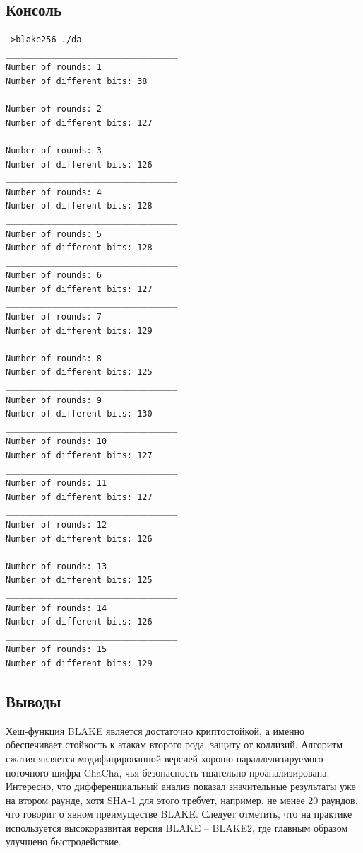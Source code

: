 \documentclass[12pt]{article}
\begin{document}
\subsection*{Консоль}
\begin{lstlisting}
->blake256 ./da
__________________________________
Number of rounds: 1
Number of different bits: 38
__________________________________
Number of rounds: 2
Number of different bits: 127
__________________________________
Number of rounds: 3
Number of different bits: 126
__________________________________
Number of rounds: 4
Number of different bits: 128
__________________________________
Number of rounds: 5
Number of different bits: 128
__________________________________
Number of rounds: 6
Number of different bits: 127
__________________________________
Number of rounds: 7
Number of different bits: 129
__________________________________
Number of rounds: 8
Number of different bits: 125
__________________________________
Number of rounds: 9
Number of different bits: 130
__________________________________
Number of rounds: 10
Number of different bits: 127
__________________________________
Number of rounds: 11
Number of different bits: 127
__________________________________
Number of rounds: 12
Number of different bits: 126
__________________________________
Number of rounds: 13
Number of different bits: 125
__________________________________
Number of rounds: 14
Number of different bits: 126
__________________________________
Number of rounds: 15
Number of different bits: 129

\end{lstlisting}

\newpage

\subsection*{Выводы}
Хеш-функция BLAKE является достаточно криптостойкой, а именно обеспечивает стойкость к атакам второго рода, защиту от коллизий. Алгоритм сжатия является модифицированной версией хорошо параллелизируемого поточного шифра ChaCha, чья безопасность тщательно проанализирована. Интересно, что дифференциальный анализ показал значительные результаты уже на втором раунде, хотя SHA-1 для этого требует, например, не менее 20 раундов, что говорит о явном преимуществе BLAKE. Следует отметить, что на практике используется высокоразвитая версия BLAKE -- BLAKE2, где главным образом улучшено быстродействие.
\end{document}
